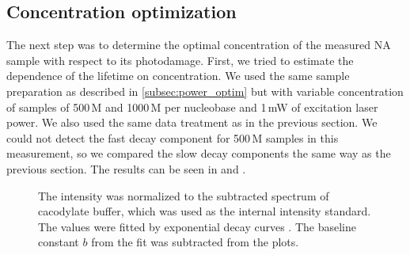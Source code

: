 \subsection{Concentration optimization}

The next step was to determine the optimal concentration of the measured NA
sample with respect to its photodamage.
First, we tried to estimate the dependence of the lifetime on concentration.
We used the same sample preparation as described in
\cref{subsec:power_optim}
but with variable concentration of samples of 500\,M and 1000\,M per
nucleobase and 1\,mW of excitation laser power.
We also used the same data treatment as in the previous section.
We could not detect the fast decay component for 500\,M samples in this
measurement, so we compared the slow decay components the same way as the
previous section.
The results can be seen in
and
.

\begin{figure}
	\centering
	
	\caption[%
		Decrease of the integral intensity of the polyU band at 1231\,\icm{} for
		different concentrations in background-corrected spectra.%
	]{%
		The intensity was normalized to the subtracted spectrum of cacodylate
		buffer, which was used as the internal intensity standard.
		The values were fitted by exponential decay curves
		.
		The baseline constant $b$ from the fit was subtracted from the plots.
	}
	\label{\figlabel{conc_optim:triplexes}}
\end{figure}

\begin{table}
	\centering
	
	\caption[%
		Lifetimes of the polyU in dependence on concentration
		estimated from the background-corrected spectra.%
	]{%
		$E_0$ are total energies accumulated by detector divided by the maximal
		value accross all the excitation powers $P$, and $E$ are energies
		accumulated from the time $T = 60\pm20$\,s, which was needed for the
		adjustment of the samples before the acquisition can even start, but
		the sample needs to be irradiated by the excitation laser. The last column
		contains fractions of the samples $r$ which were not destroyed by
		photodecomposition after the time $T$.
	}
	\label{\tablabel{conc_optim:lifetimes_triplexes}}
\end{table}

